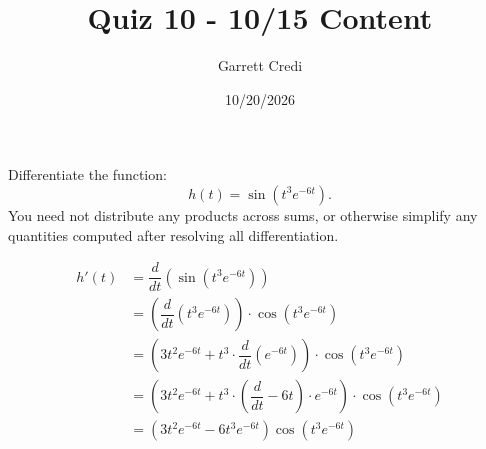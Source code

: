 \documentclass[addpoints,12pt]{exam}
\title{Quiz 10 - 10/15 Content}
\author{Garrett Credi}
\date{10/20/2026}
\begin{document}
\maketitle

\newpage

\begin{questions}
  \question[5] Differentiate the function:
  \begin{equation}
    h(t) = \sin(t^3 e^{-6t}).
  \end{equation}
  You need not distribute any products across sums, or otherwise simplify any quantities computed after resolving all differentiation.

  \begin{solution}
    \begin{align}
      h'(t) &= \dfrac{d}{dt}(\sin(t^3 e^{-6t})) \\
            &= (\dfrac{d}{dt}(t^3 e^{-6t})) \cdot \cos(t^3 e^{-6t}) \\
            &=(3t^2 e^{-6t} + t^3 \cdot \dfrac{d}{dt}(e^{-6t}))\cdot \cos(t^3 e^{-6t}) \\
            &=(3t^2 e^{-6t} + t^3 \cdot (\dfrac{d}{dt} -6t) \cdot e^{-6t}) \cdot \cos(t^3 e^{-6t}) \\
            &=(3t^2 e^{-6t} -6 t^3 e^{-6t}) \cos(t^3 e^{-6t})
    \end{align}
  \end{solution}
\end{questions}
\end{document}
